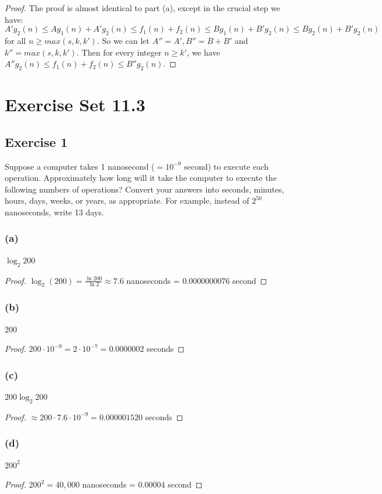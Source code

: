 \documentclass[14pt]{extarticle}
\begin{document}
\begin{proof}
    The proof is almost identical to part (a), except in the crucial step we have:
    \[
        A'g_2(n) \leq Ag_1(n) + A'g_2(n) \leq f_1(n) + f_2(n) \leq Bg_1(n) + B'g_2(n) \leq Bg_2(n) + B'g_2(n)
    \]
    for all \(n \geq max(s, k, k')\). So we can let \(A'' = A', B'' = B+B'\) and \(k'' = max(s, k, k')\). Then for every
    integer \(n \geq k'\), we have \(A''g_2(n) \leq f_1(n) + f_2(n) \leq B''g_2(n)\).
\end{proof}

\section{Exercise Set 11.3}

\subsection{Exercise 1}
Suppose a computer takes 1 nanosecond (\(= 10^{-9}\) second) to execute each operation. Approximately how long will it take
the computer to execute the following numbers of operations? Convert your answers into seconds, minutes, hours, days,
weeks, or years, as appropriate. For example, instead of \(2^{50}\) nanoseconds, write 13 days.

\subsubsection{(a)}
\(\log_2 200\)
\begin{proof}
    \(\log_2(200) = \frac{\ln 200}{\ln 2} \approx 7.6\) nanoseconds = 0.0000000076 second
\end{proof}

\subsubsection{(b)}
\(200\)
\begin{proof}
    \(200 \cdot 10^{-9} = 2 \cdot 10^{-7} = 0.0000002\) seconds
\end{proof}

\subsubsection{(c)}
\(200 \log_2 200\)
\begin{proof}
    \(\approx 200 \cdot 7.6 \cdot 10^{-9} = 0.000001520\) seconds
\end{proof}

\subsubsection{(d)}
\(200^2\)
\begin{proof}
    \(200^2 = 40,000\) nanoseconds = 0.00004 second
\end{proof}
\end{document}
